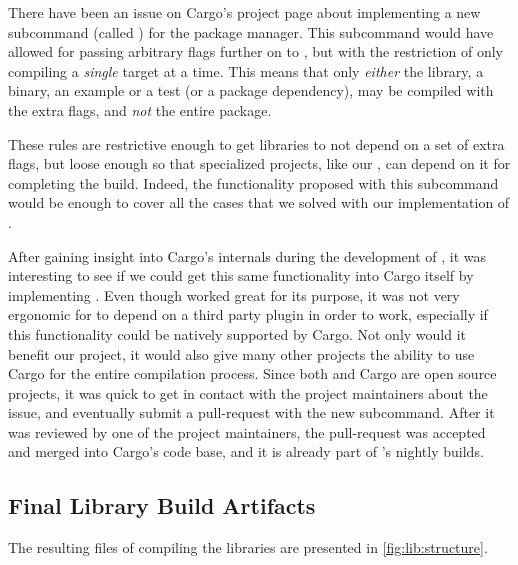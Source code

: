 There have been an issue on Cargo's project page about implementing a new subcommand (called ) for the package manager.
This subcommand would have allowed for passing arbitrary flags further on to {\rustc}, but with the restriction of only compiling a \emph{single} target at a time.
This means that only \emph{either} the library, a binary, an example or a test (or a package dependency), may be compiled with the extra flags, and \emph{not} the entire package.

These rules are restrictive enough to get libraries to not depend on a set of extra flags, but loose enough so that specialized projects, like our {\emlib}, can depend on it for completing the build.
Indeed, the functionality proposed with this subcommand would be enough to cover all the cases that we solved with our implementation of .

After gaining insight into Cargo's internals during the development of , it was interesting to see if we could get this same functionality into Cargo itself by implementing .
Even though  worked great for its purpose, it was not very ergonomic for {\emlib} to depend on a third party plugin in order to work, especially if this functionality could be natively supported by Cargo.
Not only would it benefit our project, it would also give many other {\rust} projects the ability to use Cargo for the entire compilation process.
Since both {\rust} and Cargo are open source projects, it was quick to get in contact with the project maintainers about the issue, and eventually submit a pull-request with the new subcommand.
After it was reviewed by one of the project maintainers, the pull-request was accepted and merged into Cargo's code base, and it is already part of {\rust}'s nightly builds.

\subsection{Final Library Build Artifacts}

The resulting files of compiling the libraries are presented in \autoref{fig:lib:structure}.

